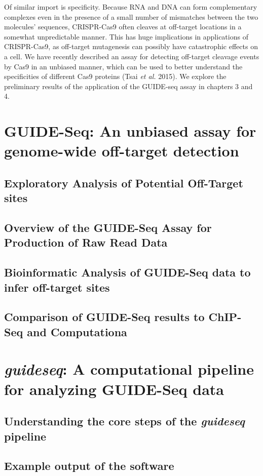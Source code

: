 \documentclass{Dissertate}
\begin{document}
Of similar import is specificity. Because RNA and DNA can form complementary complexes even in the presence of a small number of mismatches between the two molecules' sequences, CRISPR-Cas9 often cleaves at off-target locations in a somewhat unpredictable manner. This has huge implications in applications of CRISPR-Cas9, as off-target mutagenesis can possibly have catastrophic effects on a cell. We have recently described an assay for detecting off-target cleavage events by Cas9 in an unbiased manner, which can be used to better understand the specificities of different Cas9 proteins (Tsai \textit{et al.} 2015). We explore the preliminary results of the application of the GUIDE-seq assay in chapters 3 and 4.



\chapter{GUIDE-Seq: An unbiased assay for genome-wide off-target detection}
\section{Exploratory Analysis of Potential Off-Target sites}
\section{Overview of the GUIDE-Seq Assay for Production of Raw Read Data}
\section{Bioinformatic Analysis of GUIDE-Seq data to infer off-target sites}
\section{Comparison of GUIDE-Seq results to ChIP-Seq and Computationa}

\chapter{\textit{guideseq}: A computational pipeline for analyzing GUIDE-Seq data}
\section{Understanding the core steps of the \textit{guideseq} pipeline}
\section{Example output of the software}
\end{document}
